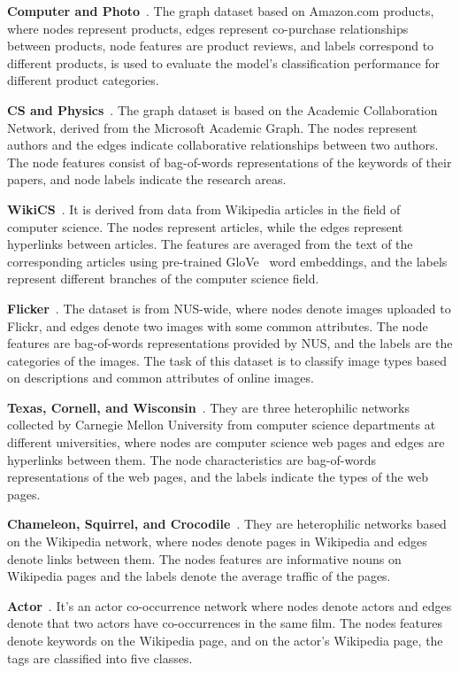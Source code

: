 \documentclass[sigconf]{acmart}
\begin{document}
\textbf{Computer and Photo}~\cite{photo}. The graph dataset based on Amazon.com products, where nodes represent products, edges represent co-purchase relationships between products, node features are product reviews, and labels correspond to different products, is used to evaluate the model's classification performance for different product categories.

\textbf{CS and Physics}~\cite{cs}. The graph dataset is based on the Academic Collaboration Network, derived from the Microsoft Academic Graph. The nodes represent authors and the edges indicate collaborative relationships between two authors. The node features consist of bag-of-words representations of the keywords of their papers, and node labels indicate the research areas.

\textbf{WikiCS}~\cite{wiki}. It is derived from data from Wikipedia articles in the field of computer science. The nodes represent articles, while the edges represent hyperlinks between articles. The features are averaged from the text of the corresponding articles using pre-trained GloVe~\cite{glove} word embeddings, and the labels represent different branches of the computer science field.

\textbf{Flicker}~\cite{graphsaint-iclr20}. The dataset is from NUS-wide, where nodes denote images uploaded to Flickr, and edges denote two images with some common attributes. The node features are bag-of-words representations provided by NUS, and the labels are the categories of the images. The task of this dataset is to classify image types based on descriptions and common attributes of online images.

\textbf{Texas, Cornell, and Wisconsin}~\cite{geom-gcn}. They are three heterophilic networks collected by Carnegie Mellon University from computer science departments at different universities, where nodes are computer science web pages and edges are hyperlinks between them. The node characteristics are bag-of-words representations of the web pages, and the labels indicate the types of the web pages.

\textbf{Chameleon, Squirrel, and Crocodile}~\cite{squchame}. They are heterophilic networks based on the Wikipedia network, where nodes denote pages in Wikipedia and edges denote links between them. The nodes features are informative nouns on Wikipedia pages and the labels denote the average traffic of the pages.

\textbf{Actor}~\cite{geom-gcn}. It's an actor co-occurrence network where nodes denote actors and edges denote that two actors have co-occurrences in the same film. The nodes features denote keywords on the Wikipedia page, and on the actor's Wikipedia page, the tags are classified into five classes.
\end{document}
